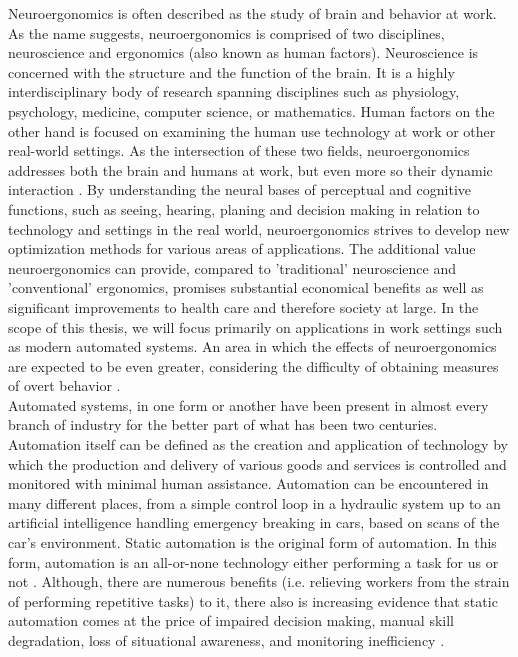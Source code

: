 
Neuroergonomics is often described as the study of brain and behavior at work. As the name suggests, neuroergonomics is comprised of two disciplines, neuroscience and ergonomics (also known as human factors). Neuroscience is concerned with the structure and the function of the brain. It is a highly interdisciplinary body of research spanning disciplines such as physiology, psychology, medicine, computer science, or mathematics. Human factors on the other hand is focused on examining the human use technology at work or other real-world settings. As the intersection of these two fields, neuroergonomics addresses both the brain and humans at work, but even more so their dynamic interaction \cite{Parasuraman2003}
. By understanding the neural bases of perceptual and cognitive functions, such as seeing, hearing, planing and decision making in relation to technology and settings in the real world, neuroergonomics strives to develop new optimization methods for various areas of applications. The additional value neuroergonomics can provide, compared to 'traditional' neuroscience and 'conventional' ergonomics, promises substantial economical benefits as well as significant improvements to health care and therefore society at large. 
In the scope of this thesis, we will focus primarily on applications in work settings such as modern automated systems. An area in which the effects of neuroergonomics are expected to be even greater, considering the difficulty of obtaining measures of overt behavior \cite{Parasuraman2003}.\\
Automated systems, in one form or another have been present in almost every branch of industry for the better part of what has been two centuries. Automation itself can be defined as the creation and application of technology by which the production and delivery of various goods and services is controlled and monitored with minimal human assistance. Automation can be encountered in many different places, from a simple control loop in a hydraulic system up to an artificial intelligence handling emergency breaking in cars, based on scans of the car's environment. 
Static automation is the original form of automation. In this form, automation is an all-or-none technology either performing a task for us or not \cite{Byrne2006}.
Although, there are numerous benefits (i.e. relieving workers from the strain of performing repetitive tasks) to it, there also is increasing evidence that static automation comes at the price of impaired decision making, manual skill degradation, loss of situational awareness, and monitoring inefficiency \cite{Byrne2006}.
